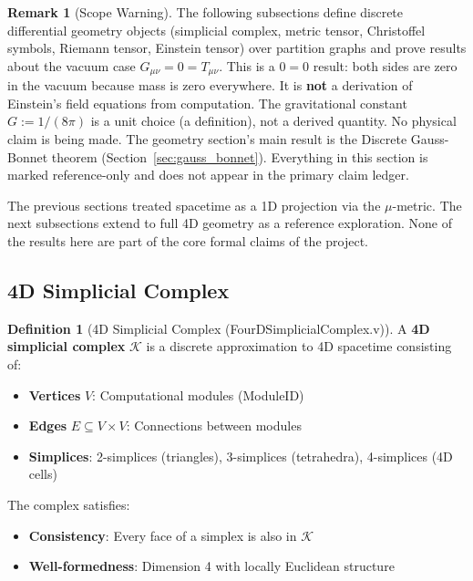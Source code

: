 \documentclass[11pt, a4paper]{report}
\theoremstyle{definition}
\newtheorem{definition}{Definition}[chapter]
\newtheorem{remark}{Remark}[chapter]
\theoremstyle{plain}
\begin{document}
\begin{remark}[Scope Warning]
The following subsections define discrete differential geometry objects (simplicial complex, metric tensor, Christoffel symbols, Riemann tensor, Einstein tensor) over partition graphs and prove results about the vacuum case $G_{\mu\nu} = 0 = T_{\mu\nu}$. This is a $0 = 0$ result: both sides are zero in the vacuum because mass is zero everywhere. It is \textbf{not} a derivation of Einstein's field equations from computation. The gravitational constant $G := 1/(8\pi)$ is a unit choice (a definition), not a derived quantity. No physical claim is being made. The geometry section's main result is the Discrete Gauss-Bonnet theorem (Section~\ref{sec:gauss_bonnet}). Everything in this section is marked reference-only and does not appear in the primary claim ledger.
\end{remark}

The previous sections treated spacetime as a 1D projection via the $\mu$-metric. The next subsections extend to full 4D geometry as a reference exploration. None of the results here are part of the core formal claims of the project.

\subsection{4D Simplicial Complex}

\begin{definition}[4D Simplicial Complex {\normalfont (FourDSimplicialComplex.v)}]
A \textbf{4D simplicial complex} $\mathcal{K}$ is a discrete approximation to 4D spacetime consisting of:
\begin{itemize}
    \item \textbf{Vertices} $V$: Computational modules (ModuleID)
    \item \textbf{Edges} $E \subseteq V \times V$: Connections between modules
    \item \textbf{Simplices}: 2-simplices (triangles), 3-simplices (tetrahedra), 4-simplices (4D cells)
\end{itemize}
The complex satisfies:
\begin{itemize}
    \item \textbf{Consistency}: Every face of a simplex is also in $\mathcal{K}$
    \item \textbf{Well-formedness}: Dimension 4 with locally Euclidean structure
\end{itemize}
\end{definition}
\end{document}
